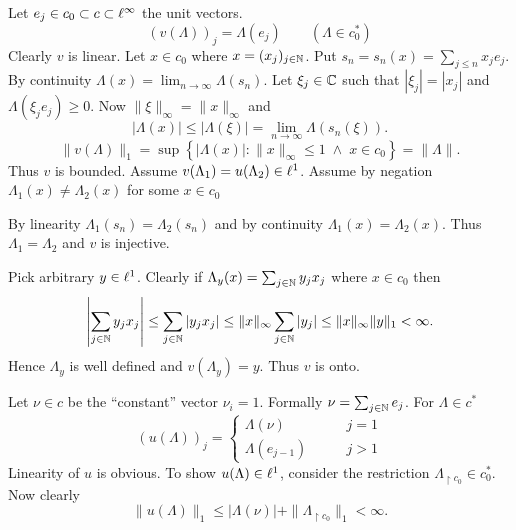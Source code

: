 \begin{enumerate}
\begin{itemize}
Let \(e_j \in c_0 \subset c \subset \ell^\infty\) the unit vectors.
\begin{equation*}
(v(\Lambda))_j = \Lambda(e_j) \qquad (\Lambda \in c_0^*)
\end{equation*}
Clearly $v$ is linear.
Let \(x\in c_0\) where \(x=(x_j)_{j\in\mathbb{N}}\).
Put \(s_n = s_n(x) = \sum_{j\leq n} x_j e_j\).
By continuity
\(\Lambda(x) = \lim_{n\to\infty}\Lambda(s_n)\).
Let \(\xi_j \in \mathbb{C}\) such that \(|\xi_j| = |x_j|\)
and \(\Lambda(\xi_j e_j) \geq 0\).
Now \(\|\xi\|_\infty = \|x\|_\infty\) and 
\begin{equation*}
|\Lambda(x)| \leq |\Lambda(\xi)|
 = \lim_{n\to\infty} \Lambda(s_n(\xi)).
\end{equation*}
\begin{equation*}
\|v(\Lambda)\|_1
  = \sup\left\{|\Lambda(x)|: \|x\|_\infty\leq 1\;\land\; x\in c_0\right\}
  = \|\Lambda\|.
\end{equation*}
Thus $v$ is bounded.
Assume \(v(\Lambda_1) = u(\Lambda_2) \in \ell^1\).
Assume by negation \(\Lambda_1(x) \neq \Lambda_2(x)\) for some \(x\in c_0\)

By linearity \(\Lambda_1(s_n) = \Lambda_2(s_n)\)
and by continuity \(\Lambda_1(x) = \Lambda_2(x)\).
Thus \(\Lambda_1 = \Lambda_2\) and $v$ is injective.

Pick arbitrary \(y \in \ell^1\).
Clearly if \(\Lambda_y(x) = \sum_{j\in\mathbb{N}} y_j x_j\) where \(x\in c_0\)
then
\begin{equation*}
\left|\sum_{j\in\mathbb{N}} y_j x_j \right|
\leq \sum_{j\in\mathbb{N}} | y_j x_j |
\leq \|x\|_\infty \sum_{j\in\mathbb{N}} | y_j |
\leq \|x\|_\infty \| y\|_1 < \infty.
\end{equation*}
Hence \(\Lambda_y\) is well defined
and \(v(\Lambda_y) = y\). Thus $v$ is onto.


Let \(\nu\in c\) be the ``constant'' vector \(\nu_i = 1\).
Formally \(\nu = \sum_{j\in\mathbb{N}} e_j\).
For \(\Lambda \in c^*\)
\begin{equation*}
\left(u(\Lambda)\right)_j =
 \left\{
   \begin{array}{ll}
     \Lambda(\nu) \qquad & j=1 \\
     \Lambda(e_{j-1}) \qquad & j > 1
   \end{array}
  \right.
\end{equation*}
Linearity of $u$ is obvious.
To show \(u(\Lambda)\in\ell^1\), consider the restriction
\(\Lambda_{\restriction {c_0}} \in c_0^*\).
Now clearly
\begin{equation*}
\|u(\Lambda)\|_1 \leq |\Lambda(\nu)| + \|\Lambda_{\restriction {c_0}}\|_1 < \infty.
\end{equation*}


\end{itemize}
\end{enumerate}

